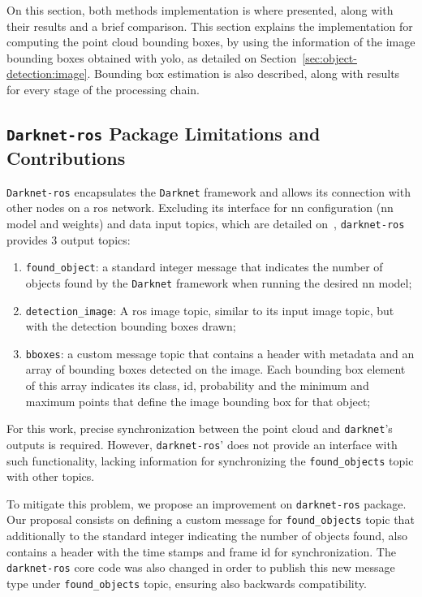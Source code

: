 On this section, both methods implementation is where presented, along with their results and a brief comparison. This section explains the implementation for computing the point cloud bounding boxes, by using the information of the image bounding boxes obtained with \ac{yolo}, as detailed on Section~\ref{sec:object-detection:image}. Bounding box estimation is also described, along with results for every stage of the processing chain.


\subsection{\texttt{Darknet-ros} Package Limitations and Contributions}
\texttt{Darknet-ros} encapsulates the \texttt{Darknet} framework and allows its connection with other nodes on a \ac{ros} network. Excluding its interface for \ac{nn} configuration (\ac{nn} model and weights) and data input topics, which are detailed on~\cite{MarkoBjelonic}, \texttt{darknet-ros} provides 3 output topics:

\begin{enumerate}
	\item \texttt{found\_object}: a standard integer message that indicates the number of objects found by the \texttt{Darknet} framework when running the desired \ac{nn} model;
	\item \texttt{detection\_image}: A \ac{ros} image topic, similar to its input image topic, but with the detection bounding boxes drawn;
	\item \texttt{bboxes}: a custom message topic that contains a header with metadata and an array of bounding boxes detected on the image. Each bounding box element of this array indicates its class, id, probability and the minimum and maximum points that define the image bounding box for that object;
\end{enumerate}

For this work, precise synchronization between the point cloud and \texttt{darknet}'s outputs is required. However, \texttt{darknet-ros}' does not provide an interface with such functionality, lacking information for synchronizing the \texttt{found\_objects} topic with other topics.

To mitigate this problem, we propose an improvement on \texttt{darknet-ros} package. Our proposal consists on defining a custom message for \texttt{found\_objects} topic that additionally to the standard integer indicating the number of objects found, also contains a header with the time stamps and frame id for synchronization. The \texttt{darknet-ros} core code was also changed in order to publish this new message type under \texttt{found\_objects} topic, ensuring also backwards compatibility.


